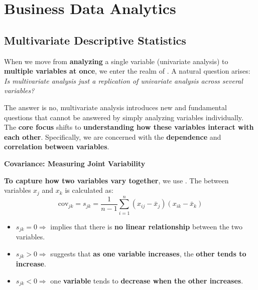 \section{Business Data Analytics}

\subsection{Multivariate Descriptive Statistics}

When we move from \textbf{analyzing} a single variable (univariate analysis) to \textbf{multiple variables at once}, we enter the realm of . A natural question arises: \emph{Is multivariate analysis just a replication of univariate analysis across several variables?}

\highspace
The answer is no, multivariate analysis introduces new and fundamental questions that cannot be answered by simply analyzing variables individually. The \textbf{core focus} shifts to \textbf{understanding how these variables interact with each other}. Specifically, we are concerned with the \textbf{dependence} and \textbf{correlation between variables}.

\highspace
\begin{flushleft}
    \textcolor{Green3}{ \textbf{Covariance: Measuring Joint Variability}}
\end{flushleft}
\textbf{To capture how two variables vary together}, we use . The  between variables $ x_{j} $ and $ x_{k} $ is calculated as:
\begin{equation}
    \text{cov}_{jk} = s_{jk} = \dfrac{1}{n-1} \displaystyle\sum_{i=1}^{n} (x_{ij} - \bar{x}_{j})(x_{ik} - \bar{x}_{k})
\end{equation}
\begin{itemize}
    \item $s_{jk} = 0 \Rightarrow$ implies that there is \textbf{no linear relationship} between the two variables.
    \item $s_{jk} > 0 \Rightarrow$ suggests that \textbf{as one variable increases}, the \textbf{other tends to increase}.
    \item $s_{jk} < 0 \Rightarrow$ one \textbf{variable} tends to \textbf{decrease when the other increases}.
\end{itemize}


